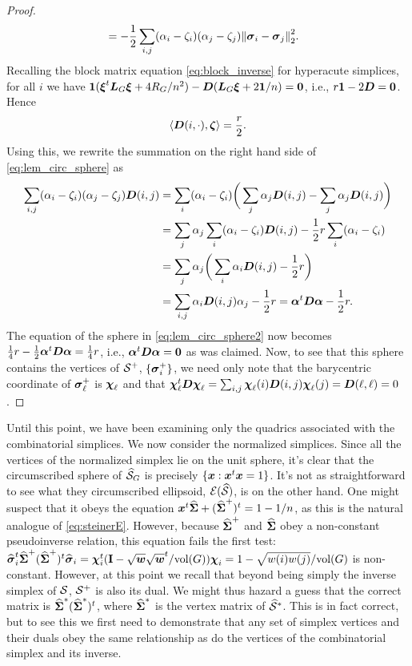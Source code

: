\begin{proof}
\begin{align}
&= -\frac{1}{2}\sum_{i,j} (\alpha_i-\zeta_i)(\alpha_j-\zeta_j)\norm{\vb*{\sigma}_i-\vb*{\sigma}_j}_2^2. \label{eq:lem_circ_sphere}
\end{align} 
Recalling the block matrix equation \eqref{eq:block_inverse} for hyperacute simplices, for all $i$ we have $\vb{1} (\vb*{\xi}^t \vb*{L}_G\vb*{\xi} + 4R_G/n^2) - \vb*{D}(\vb*{L}_G\vb*{\xi} + 2\vb{1} /n) = \vb{0}$, i.e., $r\vb{1} -2\vb*{D} =\vb{0}$. Hence 
\[\langle \vb*{D}(i,\cdot),\vb*{\zeta}\rangle = \frac{r}{2}.\]
Using this, we rewrite the summation on the right hand side of \eqref{eq:lem_circ_sphere} as 
\begin{align*}
\sum_{i,j}(\alpha_i-\zeta_i)(\alpha_j-\zeta_j)\vb*{D}(i,j) &= \sum_i (\alpha_i-\zeta_i) \bigg(\sum_j\alpha_j \vb*{D}(i,j) - \sum_j \alpha_j \vb*{D}(i,j)\bigg) \\
&= \sum_j\alpha_j \sum_i (\alpha_i-\zeta_i)\vb*{D}(i,j) - \frac{1}{2}r \sum_i (\alpha_i-\zeta_i) \\
&= \sum_j \alpha_j \bigg(\sum_i \alpha_i \vb*{D}(i,j) - \frac{1}{2}r \bigg) \\
&= \sum_{i,j} \alpha_i \vb*{D}(i,j) \alpha_j -\frac{1}{2}r= \vb*{\alpha}^t \vb*{D}\vb*{\alpha} - \frac{1}{2}r.
\end{align*}
The equation of the sphere in \eqref{eq:lem_circ_sphere2} now becomes $\frac{1}{4}r - \frac{1}{2}\vb*{\alpha}^t \vb*{D}\vb*{\alpha} = \frac{1}{4}r$, i.e., $\vb*{\alpha}^t \vb*{D}\vb*{\alpha}=\vb{0}$ as was claimed.  Now, to see that this sphere contains the vertices of $\mathcal{S}^+$,  $\{\vb*{\sigma}_i^+\}$, we need only note that the barycentric coordinate of $\vb*{\sigma}_\ell^+$ is $\boldsymbol{\chi}_\ell$ and that $\boldsymbol{\chi}_\ell^t \vb*{D} \boldsymbol{\chi}_\ell = \sum_{i,j} \boldsymbol{\chi}_\ell(i) \vb*{D}(i,j) \boldsymbol{\chi}_\ell(j) = \vb*{D}(\ell,\ell) = 0$. 
\end{proof}

Until this point, we have been examining only the quadrics associated with the combinatorial simplices. We now consider the normalized simplices. Since all the vertices of the normalized simplex lie on the unit sphere, it's clear  that the circumscribed sphere of $\widehat{\mathcal{S}}_G$ is precisely $\{\vb*{x}:\vb*{x}^t\vb*{x}=1\}$. It's not as straightforward  to see what they circumscribed ellipsoid, $\mathcal{E}(\widehat{\mathcal{S}})$, is on the other hand. One might suspect that it obeys the  equation $\vb*{x}^t \widehat{\boldsymbol{\Sigma}}+(\widehat{\boldsymbol{\Sigma}}^+)^t=1-1/n$, as this is the natural analogue of \eqref{eq:steinerE}. However, because $\widehat{\boldsymbol{\Sigma}}^+$ and $\widehat{\boldsymbol{\Sigma}}$ obey a non-constant pseudoinverse relation, this equation fails the first test: $\widehat{\vb*{\sigma}}_i^t\widehat{\boldsymbol{\Sigma}}^+(\widehat{\boldsymbol{\Sigma}}^+)^t\widehat{\vb*{\sigma}}_i = \boldsymbol{\chi}_i^t(\vb{I}-\sqrt{\vb*{w}}\sqrt{\vb*{w}}^t/\textnormal{vol}(G))\boldsymbol{\chi}_i=1-\sqrt{w(i)w(j)}/\textnormal{vol}(G)$ is non-constant. 
However, at this point we recall that beyond being simply  the inverse simplex of $\mathcal{S}$, $\mathcal{S}^+$ is also its dual.  We might thus hazard a guess that the correct matrix is $\widehat{\boldsymbol{\Sigma}}^* (\widehat{\boldsymbol{\Sigma}}^*)^t$, where $\widehat{\boldsymbol{\Sigma}}^*$ is the vertex matrix of $\widehat{\mathcal{S}}^*$. This is in fact correct, but to see this we first need to demonstrate that any set of simplex vertices and their  duals obey the same relationship as do the vertices of the combinatorial simplex and its inverse. 

